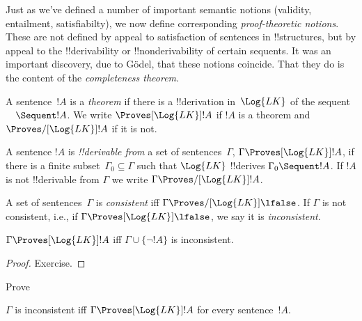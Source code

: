 \documentclass[../../include/open-logic-section]{subfiles}
\begin{document}

\begin{explain}
Just as we've defined a number of important semantic notions
(validity, entailment, satisfiabilty), we now define corresponding
\emph{proof-theoretic notions}. These are not defined by appeal to
satisfaction of sentences in !!{structure}s, but by appeal to the
!!{derivability} or !!{nonderivability} of certain sequents.  It was
an important discovery, due to G\"odel, that these notions coincide.
That they do is the content of the \emph{completeness theorem}.
\end{explain}

\begin{defn}[Theorems]
A sentence~$!A$ is a \emph{theorem} if there is a !!{derivation}
in~$\Log{LK}$ of the sequent $\quad \Sequent !A$. We write
$\Proves[\Log{LK}] !A$ if $!A$ is a theorem and $\Proves/[\Log{LK}]
!A$ if it is not.
\end{defn}

\begin{defn}[Provability]
A sentence $!A$ is \emph{!!{derivable} from} a set of
sentences~$\Gamma$, $\Gamma \Proves[\Log{LK}] !A$, if there is a
finite subset~$\Gamma_0 \subseteq \Gamma$ such that $\Log{LK}$
!!{derive}s $\Gamma_0 \Sequent !A$.  If $!A$ is not !!{derivable} from
$\Gamma$ we write $\Gamma \Proves/[\Log{LK}] !A$.
\end{defn}

\begin{defn}[Consistency]
A set of sentences~$\Gamma$ is \emph{consistent} iff $\Gamma
\Proves/[\Log{LK}] \lfalse$.  If $\Gamma$ is not consistent, i.e., if
$\Gamma \Proves[\Log{LK}] \lfalse$, we say it is \emph{inconsistent}.
\end{defn}

\begin{prop}
$\Gamma \Proves[\Log{LK}] !A$ iff $\Gamma \cup \{\lnot !A\}$ is inconsistent.
\end{prop}

\begin{proof}
Exercise.
\end{proof}

\begin{prob}
Prove 
\end{prob}

\begin{prop}
$\Gamma$ is inconsistent iff $\Gamma \Proves[\Log{LK}] {!A}$ for every
  sentence~$!A$.
\end{prop}
\end{document}
